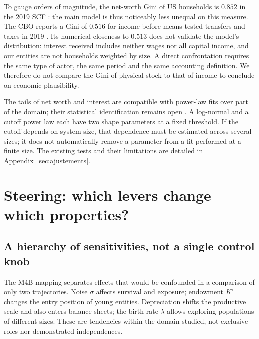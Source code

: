 
To gauge orders of magnitude, the net-worth Gini of US households is
$0.852$ in the 2019 SCF \cite{fedgini}: the main model is thus
noticeably less unequal on this measure. The CBO reports a Gini of
$0.516$ for income before means-tested transfers and taxes in 2019
\cite{cbogini}. Its numerical closeness to $0.513$ does not validate the
model's distribution: interest received includes neither wages nor all
capital income, and our entities are not households weighted by size.
A direct confrontation requires the same type of actor, the same
period and the same accounting definition. We therefore do not compare
the Gini of physical stock to that of income to conclude on economic
plausibility.

The tails of net worth and interest are compatible with power-law fits
over part of the domain; their statistical identification remains open
\cite{clauset,wildauer}. A log-normal and a cutoff power law each have
two shape parameters at a fixed threshold. If the cutoff depends on
system size, that dependence must be estimated across several sizes; it
does not automatically remove a parameter from a fit performed at a
finite size. The existing tests and their limitations are detailed in
Appendix~\ref{sec:ajustements}.

\section{Steering: which levers change which properties?}\label{sec:pilotage}
\subsection{A hierarchy of sensitivities, not a single control knob}
The M4B mapping separates effects that would be confounded in a
comparison of only two trajectories. Noise $\sigma$ affects survival and
exposure; endowment $K^\circ$ changes the entry position of young
entities. Depreciation shifts the productive scale and also enters
balance sheets; the birth rate $\lambda$ allows exploring populations of
different sizes. These are tendencies within the domain studied, not
exclusive roles nor demonstrated independences.


